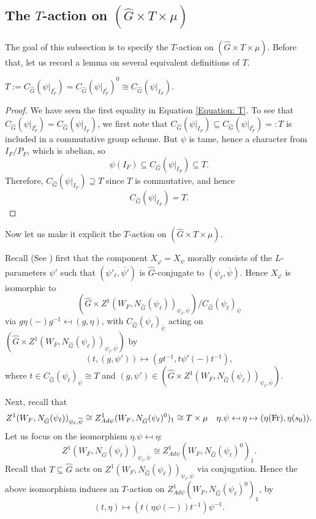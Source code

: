 \subsection{The $T$-action on $(\hat{G} \times T \times \mu)$}\label{Subsection T-action}

The goal of this subsection is to specify the $T$-action on $(\hat{G} \times T \times \mu)$. Before that, let us record a lemma on several equivalent definitions of $T$.

\begin{lemma}\label{Lemma: T}
	$T:=C_{\hat{G}}(\psi|_{I_F^{\ell}}) = C_{\hat{G}}(\psi|_{I_F^{\ell}})^0 \cong C_{\hat{G}}(\psi|_{I_F}).$
\end{lemma}

\begin{proof}
	We have seen the first equality in Equation \ref{Equation: T}. To see that $C_{\hat{G}}(\psi|_{I_F^{\ell}})=C_{\hat{G}}(\psi|_{I_F})$, we first note that $C_{\hat{G}}(\psi|_{I_F}) \subseteq C_{\hat{G}}(\psi|_{I_F^{\ell}})=:T$ is included in a commutative group scheme. But $\psi$ is tame, hence a character from $I_F/P_F$, which is abelian, so 
	$$\psi(I_F) \subseteq C_{\hat{G}}(\psi|_{I_F}) \subseteq T.$$
	Therefore, $C_{\hat{G}}(\psi|_{I_F}) \supseteq T$ since $T$ is commutative, and hence
	$$C_{\hat{G}}(\psi|_{I_F}) = T.$$
\end{proof}

Now let us make it explicit the $T$-action on $(\hat{G} \times T \times \mu)$.

Recall (See \cite[Subsection 4.6]{dat2022ihes}) first that the component $X_{\varphi}=X_{\psi}$ morally consists of the $L$-parameters $\psi'$ such that $(\psi'_{\ell}, \overline{\psi'})$ is $\hat{G}$-conjugate to $(\psi_{\ell}, \overline{\psi})$. Hence $X_{\varphi}$ is isomorphic to 
$$(\hat{G} \times Z^1(W_F, N_{\hat{G}}(\psi_{\ell}))_{\psi_{\ell}, \overline{\psi}})/C_{\hat{G}}(\psi_{\ell})_{\overline{\psi}}$$
via $g\eta(-)g^{-1} \mapsfrom (g, \eta)$, with $C_{\hat{G}}(\psi_{\ell})_{\overline{\psi}}$ acting on $(\hat{G} \times Z^1(W_F, N_{\hat{G}}(\psi_{\ell}))_{\psi_{\ell}, \overline{\psi}})$ by 
$$(t, (g, \psi')) \mapsto (gt^{-1}, t\psi'(-)t^{-1}),$$
where $t \in C_{\hat{G}}(\psi_{\ell})_{\overline{\psi}} \cong T$ and $(g, \psi') \in (\hat{G} \times Z^1(W_F, N_{\hat{G}}(\psi_{\ell}))_{\psi_{\ell}, \overline{\psi}})$.

Next, recall that 
$$Z^1(W_F, N_{\hat{G}}(\psi_{\ell}))_{\psi_{\ell}, \overline{\psi}} \cong Z^1_{Ad\psi}(W_F, N_{\hat{G}}(\psi_{\ell})^0)_1 \cong T \times \mu \quad \eta.\psi \mapsfrom \eta \mapsto (\eta(\operatorname{Fr}), \eta(s_0)).$$
Let us focus on the isomorphism $\eta.\psi \mapsfrom \eta$:
$$Z^1(W_F, N_{\hat{G}}(\psi_{\ell}))_{\psi_{\ell}, \overline{\psi}} \cong Z^1_{Ad\psi}(W_F, N_{\hat{G}}(\psi_{\ell})^0)_1.$$
Recall that $T \subseteq \hat{G}$ acts on $Z^1(W_F, N_{\hat{G}}(\psi_{\ell}))_{\psi_{\ell}, \overline{\psi}}$ via conjugation. Hence the above isomorphism induces an $T$-action on $Z^1_{Ad\psi}(W_F, N_{\hat{G}}(\psi_{\ell})^0)_1$, by
$$(t, \eta) \mapsto (t(\eta\psi(-)) t^{-1})\psi^{-1}.$$

